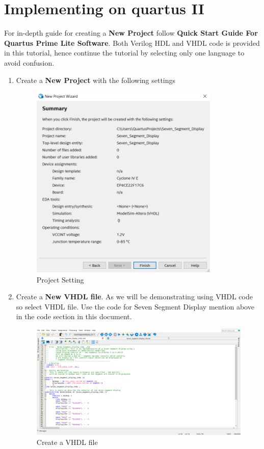 \documentclass[12pt,singleside,a4paper]{article}
\begin{document}
\section{Implementing on quartus II}
 
For in-depth guide for creating a \textbf{New Project} follow \textbf{Quick Start Guide For Quartus Prime Lite Software}. Both Verilog HDL and VHDL code is provided in this tutorial, hence continue the tutorial by selecting only one language to avoid confusion.

\begin{enumerate}
    \item Create a \textbf{New Project} with the following settings
    \begin{figure}[H]
    \centering
    \includegraphics[width=9cm,keepaspectratio]{Project/Create1.png}
    \caption{Project Setting}
    \end{figure}

    \item Create a \textbf{New VHDL file}. As we will be demonstrating using VHDL code so select VHDL file. Use the code for Seven Segment Display mention above in the code section in this document.
    \begin{figure}[H]
    \centering
    \includegraphics[width=12cm,keepaspectratio]{Project/vhdl.png}
    \caption{Create a VHDL file}
    \end{figure}
    \newpage
    

\end{enumerate}
\end{document}
